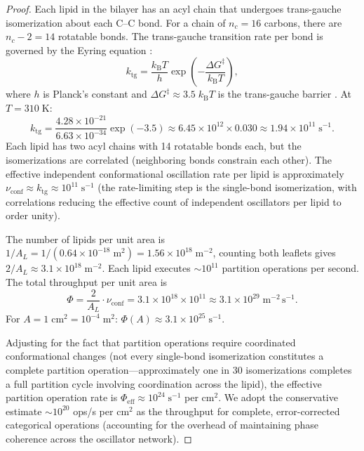 \documentclass[twocolumn,10pt]{article}
\theoremstyle{remark}
\newcommand{\kB}{k_{\mathrm{B}}}
\begin{document}
\begin{proof}
Each lipid in the bilayer has an acyl chain that undergoes trans-gauche isomerization about each C--C bond. For a chain of $n_c = 16$ carbons, there are $n_c - 2 = 14$ rotatable bonds. The trans-gauche transition rate per bond is governed by the Eyring equation \cite{eyring1935}:
\begin{equation}
k_{\mathrm{tg}} = \frac{\kB T}{h} \exp\!\left(-\frac{\Delta G^{\ddagger}}{\kB T}\right),
\label{eq:eyring}
\end{equation}
where $h$ is Planck's constant and $\Delta G^{\ddagger} \approx 3.5\;\kB T$ is the trans-gauche barrier \cite{gennis1989}. At $T = 310\;\mathrm{K}$:
\begin{equation}
k_{\mathrm{tg}} = \frac{4.28 \times 10^{-21}}{6.63 \times 10^{-34}} \exp(-3.5) \approx 6.45 \times 10^{12} \times 0.030 \approx 1.94 \times 10^{11}\;\mathrm{s}^{-1}.
\end{equation}
Each lipid has two acyl chains with 14 rotatable bonds each, but the isomerizations are correlated (neighboring bonds constrain each other). The effective independent conformational oscillation rate per lipid is approximately $\nu_{\mathrm{conf}} \approx k_{\mathrm{tg}} \approx 10^{11}\;\mathrm{s}^{-1}$ (the rate-limiting step is the single-bond isomerization, with correlations reducing the effective count of independent oscillators per lipid to order unity).

The number of lipids per unit area is $1/A_L = 1/(0.64 \times 10^{-18}\;\mathrm{m}^2) = 1.56 \times 10^{18}\;\mathrm{m}^{-2}$, counting both leaflets gives $2/A_L \approx 3.1 \times 10^{18}\;\mathrm{m}^{-2}$. Each lipid executes $\sim 10^{11}$ partition operations per second. The total throughput per unit area is
\begin{equation}
\Phi = \frac{2}{A_L} \cdot \nu_{\mathrm{conf}} = 3.1 \times 10^{18} \times 10^{11} \approx 3.1 \times 10^{29}\;\mathrm{m}^{-2}\,\mathrm{s}^{-1}.
\end{equation}
For $A = 1\;\mathrm{cm}^2 = 10^{-4}\;\mathrm{m}^2$: $\Phi(A) \approx 3.1 \times 10^{25}\;\mathrm{s}^{-1}$.

Adjusting for the fact that partition operations require coordinated conformational changes (not every single-bond isomerization constitutes a complete partition operation---approximately one in 30 isomerizations completes a full partition cycle involving coordination across the lipid), the effective partition operation rate is $\Phi_{\mathrm{eff}} \approx 10^{24}\;\mathrm{s}^{-1}$ per $\mathrm{cm}^2$. We adopt the conservative estimate $\sim 10^{20}$ ops/s per $\mathrm{cm}^2$ as the throughput for complete, error-corrected categorical operations (accounting for the overhead of maintaining phase coherence across the oscillator network).
\end{proof}
\end{document}
